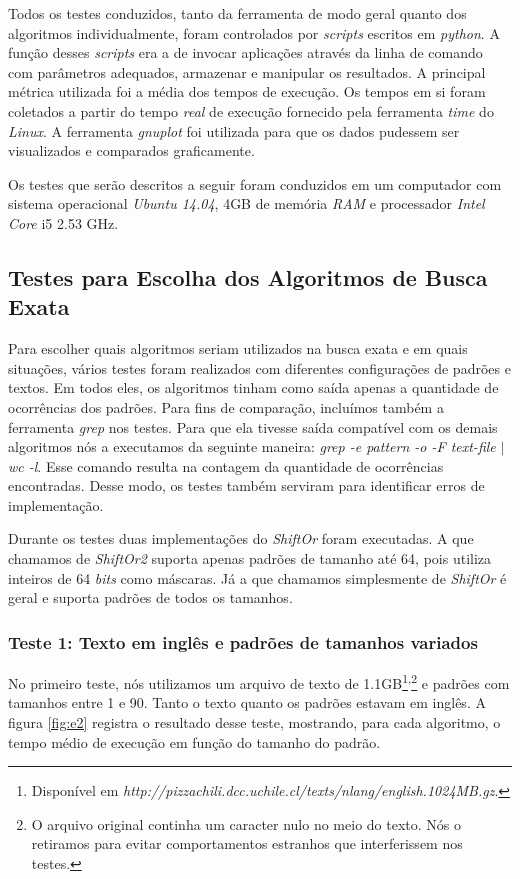\documentclass[]{article}
\newcommand{\figref}[1]{figura \ref{#1}}
\begin{document}
Todos os testes conduzidos, tanto da ferramenta de modo geral quanto dos algoritmos individualmente, foram controlados por \textit{scripts} escritos em \textit{python}. A função desses \textit{scripts} era a de invocar aplicações através da linha de comando com parâmetros adequados, armazenar e manipular os resultados. A principal métrica utilizada foi a média dos tempos de execução. Os tempos em si foram coletados a partir do tempo \textit{real} de execução fornecido pela ferramenta \textit{time} do \textit{Linux}. A ferramenta \textit{gnuplot} foi utilizada para que os dados pudessem ser visualizados e comparados graficamente.

Os testes que serão descritos a seguir foram conduzidos em um computador com sistema operacional \textit{Ubuntu 14.04}, 4GB de memória \textit{RAM} e processador \textit{Intel Core} i5 2.53 GHz.

\subsection{Testes para Escolha dos Algoritmos de Busca Exata}
Para escolher quais algoritmos seriam utilizados na busca exata e em quais situações, vários testes foram realizados com diferentes configurações de padrões e textos. Em todos eles, os algoritmos tinham como saída apenas a quantidade de ocorrências dos padrões. Para fins de comparação, incluímos também a ferramenta \textit{grep} nos testes. Para que ela tivesse saída compatível com os demais algoritmos nós a executamos da seguinte maneira: \textit{grep -e pattern -o -F text-file $\vert$ wc -l}. Esse comando resulta na contagem da quantidade de ocorrências encontradas. Desse modo, os testes também serviram para identificar erros de implementação.

Durante os testes duas implementações do \textit{ShiftOr} foram executadas. A que chamamos de \textit{ShiftOr2} suporta apenas padrões de tamanho até 64, pois utiliza inteiros de 64 \textit{bits} como máscaras. Já a que chamamos simplesmente de \textit{ShiftOr} é geral e suporta padrões de todos os tamanhos.

\subsubsection{Teste 1: Texto em inglês e padrões de tamanhos variados}

No primeiro teste, nós utilizamos um arquivo de texto de 1.1GB\footnote{Disponível em \textit{http://pizzachili.dcc.uchile.cl/texts/nlang/english.1024MB.gz}.}\textsuperscript{,}\footnote{O arquivo original continha um caracter nulo no meio do texto. Nós o retiramos para evitar comportamentos estranhos que interferissem nos testes.} e padrões com tamanhos entre 1 e 90. Tanto o texto quanto os padrões estavam em inglês. A \figref{fig:e2} registra o resultado desse teste, mostrando, para cada algoritmo, o tempo médio de execução em função do tamanho do padrão.
\end{document}
